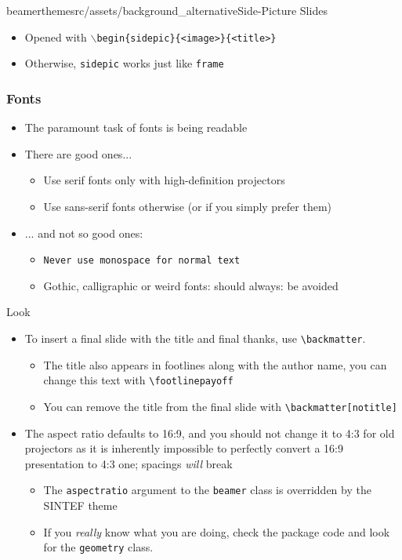 \begin{sidepic}{beamerthemesrc/assets/background_alternative}{Side-Picture Slides}
\begin{itemize}
\item Opened with \texttt{$\backslash$begin\{sidepic\}\{<image>\}\{<title>\}}
\item Otherwise, \texttt{sidepic} works just like \texttt{frame}
\end{itemize}
\end{sidepic}

\footlinecolor{}
\begin{frame}
\frametitle{Fonts}
\begin{itemize}
\item The paramount task of fonts is being readable
\item There are good ones...
  \begin{itemize}
  \item {\textrm{Use serif fonts only with high-definition projectors}}
  \item {\textsf{Use sans-serif fonts otherwise (or if you simply prefer 
them)}}
  \end{itemize}
\item ... and not so good ones:
  \begin{itemize}
  \item {\texttt{Never use monospace for normal text}}
  \item {\frakfamily Gothic, calligraphic or weird fonts: should always: be
  avoided}
\end{itemize}
\end{itemize}
\end{frame}

\begin{frame}[fragile]{Look}
\begin{itemize}
\item To insert a final slide with the title and final thanks, use \verb|\backmatter|.
      \begin{itemize}
      \item The title also appears in footlines along with the author name, you can change this text with \verb|\footlinepayoff|
      \item You can remove the title from the final slide with \verb|\backmatter[notitle]|
      \end{itemize}
\item The aspect ratio defaults to 16:9, and you should not change it to 4:3
      for old projectors as it is inherently impossible to perfectly convert a 
      16:9 presentation to 4:3 one; spacings \emph{will} break
      \begin{itemize}
      \item The \texttt{aspectratio} argument to the \texttt{beamer} class is
            overridden by the SINTEF theme
      \item If you \emph{really} know what you are doing, check the package
            code and look for the \texttt{geometry} class.
      \end{itemize}
\end{itemize}
\end{frame}
